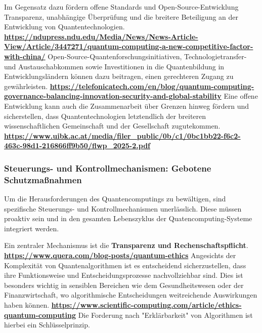 {Im Gegensatz dazu fördern offene Standards und Open-Source-Entwicklung Transparenz, unabhängige Überprüfung und die breitere Beteiligung an der Entwicklung von Quantentechnologien. \textbf{\href{https://ndupress.ndu.edu/Media/News/News-Article-View/Article/3447271/quantum-computing-a-new-competitive-factor-with-china/}{https://ndupress.ndu.edu/Media/News/News-Article-View/Article/3447271/quantum-computing-a-new-competitive-factor-with-china/}} Open-Source-Quantenforschungsinitiativen, Technologietransfer- und Austauschabkommen sowie Investitionen in die Quantenbildung in Entwicklungsländern können dazu beitragen, einen gerechteren Zugang zu gewährleisten. \textbf{\href{https://telefonicatech.com/en/blog/quantum-computing-governance-balancing-innovation-security-and-global-stability}{https://telefonicatech.com/en/blog/quantum-computing-governance-balancing-innovation-security-and-global-stability}} Eine offene Entwicklung kann auch die Zusammenarbeit über Grenzen hinweg fördern und sicherstellen, dass Quantentechnologien letztendlich der breiteren wissenschaftlichen Gemeinschaft und der Gesellschaft zugutekommen. \textbf{\href{https://www.uibk.ac.at/media/filer_public/0b/c1/0bc1bb22-f6c2-463c-98d1-216866ff9b50/flwp_2025-2.pdf}{https://www.uibk.ac.at/media/filer\_public/0b/c1/0bc1bb22-f6c2-463c-98d1-216866ff9b50/flwp\_2025-2.pdf}}


\subsubsection{\textbf{Steuerungs- und Kontrollmechanismen: Gebotene Schutzmaßnahmen}}

Um die Herausforderungen des Quantencomputings zu bewältigen, sind spezifische Steuerungs- und Kontrollmechanismen unerlässlich. Diese müssen proaktiv sein und in den gesamten Lebenszyklus der Quatencomputing-Systeme integriert werden.

Ein zentraler Mechanismus ist die \textbf{Transparenz und Rechenschaftspflicht}. \textbf{\href{https://www.quera.com/blog-posts/quantum-ethics}{https://www.quera.com/blog-posts/quantum-ethics}} Angesichts der Komplexität von Quantenalgorithmen ist es entscheidend sicherzustellen, dass ihre Funktionsweise und Entscheidungsprozesse nachvollziehbar sind. Dies ist besonders wichtig in sensiblen Bereichen wie dem Gesundheitswesen oder der Finanzwirtschaft, wo algorithmische Entscheidungen weitreichende Auswirkungen haben können. \textbf{\href{https://www.scientific-computing.com/article/ethics-quantum-computing}{https://www.scientific-computing.com/article/ethics-quantum-computing}} Die Forderung nach "Erklärbarkeit" von Algorithmen ist hierbei ein Schlüsselprinzip.

}
